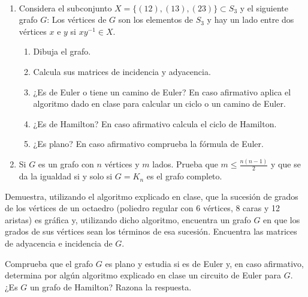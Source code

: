 \begin{ejercicio}\label{ej:1.29}~
    \begin{enumerate}
        \item Considera el subconjunto $X = \{(12),(13),(23)\} \subset S_3$ y el siguiente grafo $G$: Los vértices de $G$ son los elementos de $S_3$ y hay un lado entre dos vértices $x$ e $y$ si $xy^{-1} \in X$.
        \begin{enumerate}
            \item Dibuja el grafo.
            \item Calcula sus matrices de incidencia y adyacencia.
            \item ¿Es de Euler o tiene un camino de Euler? En caso afirmativo aplica el algoritmo dado en clase para calcular un ciclo o un camino de Euler.
            \item ¿Es de Hamilton? En caso afirmativo calcula el ciclo de Hamilton.
            \item ¿Es plano? En caso afirmativo comprueba la fórmula de Euler.
        \end{enumerate}
        \item Si $G$ es un grafo con $n$ vértices y $m$ lados. Prueba que $m \leq \frac{n(n-1)}{2}$ y que se da la igualdad si y solo si $G = K_n$ es el grafo completo.
    \end{enumerate}
\end{ejercicio}

\begin{ejercicio}\label{ej:1.30}
    Demuestra, utilizando el algoritmo explicado en clase, que la sucesión de grados de los vértices de un octaedro (poliedro regular con 6 vértices, 8 caras y 12 aristas) es gráfica y, utilizando dicho algoritmo, encuentra un grafo $G$ en que los grados de sus vértices sean los términos de esa sucesión. Encuentra las matrices de adyacencia e incidencia de $G$.
    
    Comprueba que el grafo $G$ es plano y estudia si es de Euler y, en caso afirmativo, determina por algún algoritmo explicado en clase un circuito de Euler para $G$. ¿Es $G$ un grafo de Hamilton? Razona la respuesta.
\end{ejercicio}


